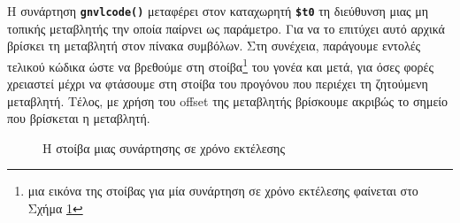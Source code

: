 \documentclass[a4paper]{article}
\let\OldTexttt\texttt
\renewcommand{\texttt}[1]{\OldTexttt{\textbf{#1}}}
\begin{document}
Η συνάρτηση \texttt{gnvlcode()} μεταφέρει στον καταχωρητή \texttt{\$t0} τη
διεύθυνση μιας μη τοπικής μεταβλητής την οποία παίρνει ως παράμετρο. Για να
το επιτύχει αυτό αρχικά βρίσκει τη μεταβλητή στον πίνακα συμβόλων. Στη
συνέχεια, παράγουμε εντολές τελικού κώδικα ώστε να βρεθούμε στη
στοίβα\footnote{μια εικόνα της στοίβας για μία συνάρτηση σε χρόνο εκτέλεσης
φαίνεται στο Σχήμα \ref{figure:stack}} του γονέα και μετά, για όσες φορές
χρειαστεί μέχρι να φτάσουμε στη στοίβα του προγόνου που περιέχει τη
ζητούμενη μεταβλητή. Τέλος, με χρήση του offset της μεταβλητής βρίσκουμε
ακριβώς το σημείο που βρίσκεται η μεταβλητή.
\begin{figure}[!htpb]
    \caption{Η στοίβα μιας συνάρτησης σε χρόνο εκτέλεσης}
    \label{figure:stack}
\end{figure}
\end{document}
